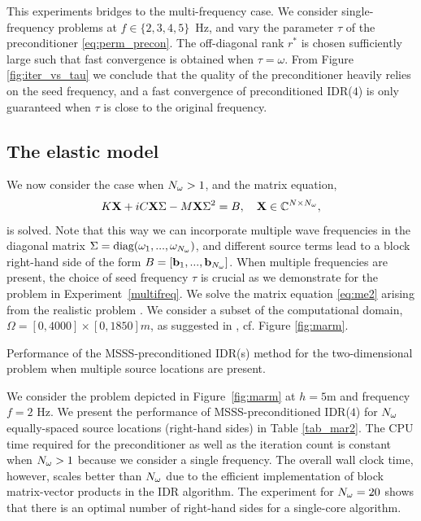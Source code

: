 This experiments bridges to the multi-frequency case. We consider single-frequency problems at $f \in \{2,3,4,5\}$~Hz, and vary the parameter $\tau$ of the preconditioner \eqref{eq:perm_precon}. The off-diagonal rank $r^\ast$ is chosen sufficiently large such that fast convergence is obtained when $\tau = \omega$. From Figure \ref{fig:iter_vs_tau} we conclude that the quality of the preconditioner heavily relies on the seed frequency, and a fast convergence of preconditioned IDR($4$) is only guaranteed when $\tau$ is close to the original frequency.

\subsection{The elastic \marmousi model}
\label{ch:best_tau} 
We now consider the case when ${N_{\omega}} > 1$, and the matrix equation,
\begin{align}
\label{eq:me2}
K {\mathbf{X}} + i C {\mathbf{X}} \Sigma - M {\mathbf{X}} \Sigma^2 = B, \quad {\mathbf{X}} \in \mathbb{C}^{N \times {N_{\omega}}},
\end{align}
is solved. Note that this way we can incorporate multiple wave frequencies in the diagonal matrix $\Sigma = \text{diag}(\omega_1,...,\omega_{N_{\omega}})$, and different source terms lead to a block right-hand side of the form $B = [\mathbf{b}_1,...,\mathbf{b}_{N_{\omega}}]$. When multiple frequencies are present, the choice of seed frequency $\tau$ is crucial as we demonstrate for the \marmousi problem in Experiment~\ref{multifreq}.
We solve the matrix equation \eqref{eq:me2} arising from the realistic \marmousi problem \cite{marm2}. We consider a subset of the computational domain, $\Omega = [0,4000] \times [0,1850] m$, as suggested in \cite{Rizzuti2016}, cf. Figure \ref{fig:marm}.

\begin{exper}\label{multiRHS}
Per\-for\-mance of the MSSS-preconditioned IDR(s) method for the two-dimensional \marmousi problem when multiple source locations are present.
\end{exper}
We consider the \marmousi problem depicted in Figure~\ref{fig:marm} at $h=5$m and frequency $f=2$ Hz. We present the performance of MSSS-preconditioned IDR($4$) for ${N_{\omega}}$ e\-qually-spaced source locations (right-hand sides) in Table \ref{tab_mar2}. The CPU time required for the preconditioner as well as the iteration count is constant when ${N_{\omega}} > 1$ because we consider a single frequency. The overall wall clock time, however, scales better than ${N_{\omega}}$ due to the efficient implementation of block matrix-vector products in the IDR algorithm. The experiment for ${N_{\omega}}=20$ shows that there is an optimal number of right-hand sides for a single-core algorithm.

